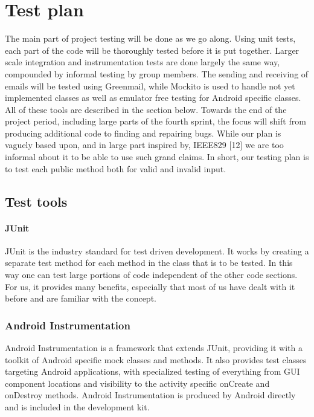\chapter{Test plan}

The main part of project testing will be done as we go along. Using unit tests, each part of the code will be thoroughly tested before it is put together. Larger scale integration and instrumentation tests are done largely the same way, compounded by informal testing by group members. The sending and receiving of emails will be tested using Greenmail, while Mockito is used to handle not yet implemented classes as well as emulator free testing for Android specific classes. All of these tools are described in the section below. Towards the end of the project period, including large parts of the fourth sprint, the focus will shift from producing additional code to finding and repairing bugs. While our plan is vaguely based upon, and in large part inspired by, IEEE829 [12] we are too informal about it to be able to use such grand claims. In short, our testing plan is to test each public method both for valid and invalid input.

\section{Test tools}
\subsubsection{JUnit}
JUnit is the industry standard for test driven development. It works by creating a separate test method for each method in the class that is to be tested. In this way one can test large portions of code independent of the other code sections. For us, it provides many benefits, especially that most of us have dealt with it before and are familiar with the concept.

\subsection{Android Instrumentation}
Android Instrumentation is a framework that extends JUnit, providing it with a toolkit of Android specific mock classes and methods. It also provides test classes targeting Android applications, with specialized testing of everything from GUI component locations and visibility to the activity specific onCreate and onDestroy methods. Android Instrumentation is produced by Android directly and is included in the development kit.

